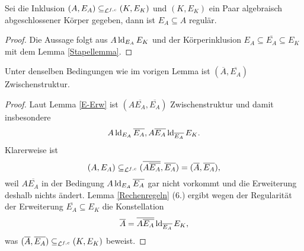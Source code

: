     \begin{lemma}
    	Sei die Inklusion $(A,E_A)\subseteq_{\mathcal{L}^{f,c}}(K,E_K)$ und $(K,E_K)$ ein Paar algebraisch abgeschlossener Körper gegeben, dann ist $E_A\subseteq A$ regulär.
    \end{lemma}
    \begin{proof}
    	Die Aussage folgt aus $A\operatorname{ld}_{E_A}E_K$ und der Körperinklusion $E_A\subseteq\overline{E_A}\subseteq E_K$ mit dem Lemma \ref{Stapellemma}.
    \end{proof}
    
    \begin{lemma}\label{alg Abschl}
    	Unter denselben Bedingungen wie im vorigen Lemma ist $(\overline{A},\overline{E_A})$ Zwischenstruktur.
    \end{lemma}
    \begin{proof}
    	Laut Lemma \ref{E-Erw} ist $(A\overline{E_A},\overline{E_A})$ Zwischenstruktur und damit insbesondere $$A\operatorname{ld}_{E_A}\overline{E_A},A\overline{E_A}\operatorname{ld}_{\overline{E_A}}E_K.$$ Klarerweise ist $$(A,E_A)\subseteq_{\mathcal{L}^{f,c}}(\overline{A\overline{E_A}},\overline{E_A})=(\overline{A},\overline{E_A}),$$ weil $A\overline{E_A}$ in der Bedingung $A\operatorname{ld}_{E_A}\overline{E_A}$ gar nicht vorkommt und die Erweiterung deshalb nichts ändert.\newpage
    	Lemma \ref{Rechenregeln} (6.) ergibt wegen der Regularität der Erweiterung $\overline{E_A}\subseteq E_K$ die Konstellation $$\overline{A}=\overline{A\overline{E_A}}\operatorname{ld}_{\overline{E_A}}E_K,$$ was $(\overline{A},\overline{E_A})\subseteq_{\mathcal{L}^{f,c}}(K,E_K)$ beweist.
    \end{proof}
    
